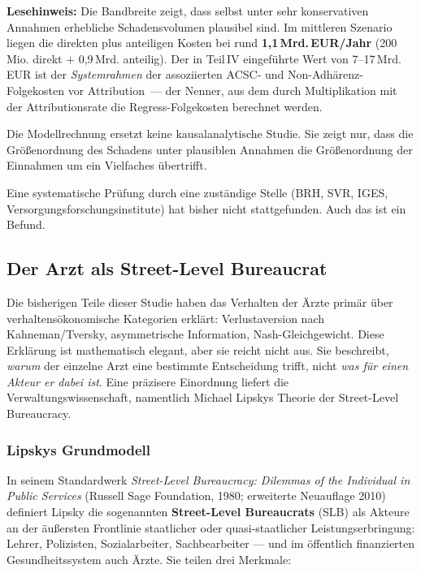 \documentclass{umbruch-position}
\begin{document}
\textbf{Lesehinweis:} Die Bandbreite zeigt, dass selbst unter sehr konservativen Annahmen erhebliche Schadensvolumen plausibel sind. Im mittleren Szenario liegen die direkten plus anteiligen Kosten bei rund \textbf{1,1\,Mrd.\,EUR/Jahr} (200\,Mio. direkt + 0,9\,Mrd. anteilig). Der in Teil\,IV eingeführte Wert von 7--17\,Mrd.\,EUR ist der \emph{Systemrahmen} der assoziierten ACSC- und Non-Adhärenz-Folgekosten vor Attribution~--- der Nenner, aus dem durch Multiplikation mit der Attributionsrate die Regress-Folgekosten berechnet werden.

Die Modellrechnung ersetzt keine kausalanalytische Studie. Sie zeigt nur, dass die Größenordnung des Schadens unter plausiblen Annahmen die Größenordnung der Einnahmen um ein Vielfaches übertrifft.

Eine systematische Prüfung durch eine zuständige Stelle (BRH, SVR, IGES, Versorgungsforschungsinstitute) hat bisher nicht stattgefunden. Auch das ist ein Befund.

\subsection{Der Arzt als Street-Level Bureaucrat}

Die bisherigen Teile dieser Studie haben das Verhalten der Ärzte primär über verhaltensökonomische Kategorien erklärt: Verlustaversion nach Kahneman/Tversky, asymmetrische Information, Nash-Gleichgewicht. Diese Erklärung ist mathematisch elegant, aber sie reicht nicht aus. Sie beschreibt, \textit{warum} der einzelne Arzt eine bestimmte Entscheidung trifft, nicht \textit{was für einen Akteur er dabei ist}. Eine präzisere Einordnung liefert die Verwaltungswissenschaft, namentlich Michael Lipskys Theorie der Street-Level Bureaucracy.

\subsubsection{Lipskys Grundmodell}

In seinem Standardwerk \textit{Street-Level Bureaucracy: Dilemmas of the Individual in Public Services} (Russell Sage Foundation, 1980; erweiterte Neuauflage 2010) definiert Lipsky die sogenannten \textbf{Street-Level Bureaucrats} (SLB) als Akteure an der äußersten Frontlinie staatlicher oder quasi-staatlicher Leistungserbringung: Lehrer, Polizisten, Sozialarbeiter, Sachbearbeiter --- und im öffentlich finanzierten Gesundheitssystem auch Ärzte. Sie teilen drei Merkmale:
\end{document}
